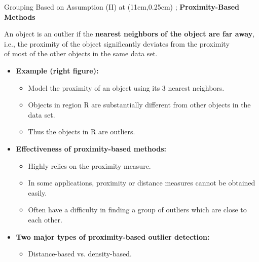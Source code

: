 \begin{frame}{Grouping Based on Assumption (II)}
	\tikzoverlay at (11cm,0.25cm) {};
	\textcolor{faugray}{\textbf{Proximity-Based Methods}}

	An object is an outlier if the \textbf{\color{airforceblue}nearest neighbors of the object are far away},\\ i.e., the proximity of the object significantly deviates from the proximity\\ of most of the other objects in the same data set.
	\begin{itemize}

		\item \textbf{Example (right figure):}
		      \begin{itemize}
			      \item Model the proximity of an object using its 3 nearest neighbors.
			      \item Objects in region R are substantially different from other objects in the data set.
			      \item Thus the objects in R are outliers.
		      \end{itemize}
		\item \textbf{Effectiveness of proximity-based methods:}
		      \begin{itemize}
			      \item Highly relies on the proximity measure.
			      \item In some applications, proximity or distance measures cannot be obtained easily.
			      \item Often have a difficulty in finding a group of outliers which are close to each other.
		      \end{itemize}
		\item \textbf{Two major types of proximity-based outlier detection:}
		      \begin{itemize}
			      \item Distance-based vs. density-based.
		      \end{itemize}
	\end{itemize}
\end{frame}


